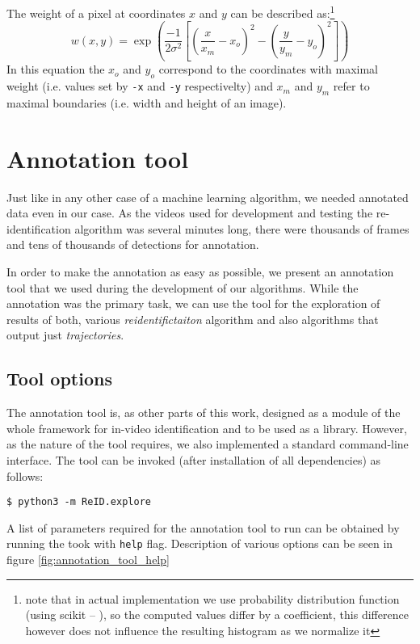 The weight of a pixel at coordinates $x$ and $y$ can be described as:\footnote{note that 
in actual implementation we use probability distribution function (using scikit -- 
\cite{scipy}), so the computed values differ by a coefficient, this difference however 
does not influence the resulting histogram as we normalize it}
$$w(x,y) = \exp\left(\frac{-1}{2\sigma^2} \left[\left(\frac{x}{x_m}-x_o\right)^2 - \left(\frac{y}{y_m}-y_o\right)^2 \right]\right)$$
In this equation the $x_o$ and $y_o$ correspond to the coordinates with maximal
weight (i.e. values set by \verb+-x+ and \verb+-y+ respectivelty) and $x_m$ and $y_m$
refer to maximal boundaries (i.e. width and height of an image).

\section{Annotation tool}

Just like in any other case of a machine learning algorithm, we needed annotated data even in our case. As the videos used for development and testing the re-identification algorithm was several minutes long, there were thousands of frames and tens of thousands
of detections for annotation.

In order to make the annotation as easy as possible, we present an annotation tool that we used during the development of our algorithms. While the annotation was the primary task, we can use the tool for the exploration of results of both, various 
\emph{reidentifictaiton} algorithm and also algorithms that output just 
\emph{trajectories}.

\subsection{Tool options}

The annotation tool is, as other parts of this work, designed as a module of the whole
framework for in-video identification and to be used as a library. However, as the
nature of the tool requires, we also implemented a standard command-line interface.
The tool can be invoked (after installation of all dependencies) as follows:

\begin{verbatim}
$ python3 -m ReID.explore    
\end{verbatim}

A list of parameters required for the annotation tool to run can be obtained by running
the took with \texttt{\-\-help} flag. Description of various options can be seen in
figure \ref{fig:annotation_tool_help}

